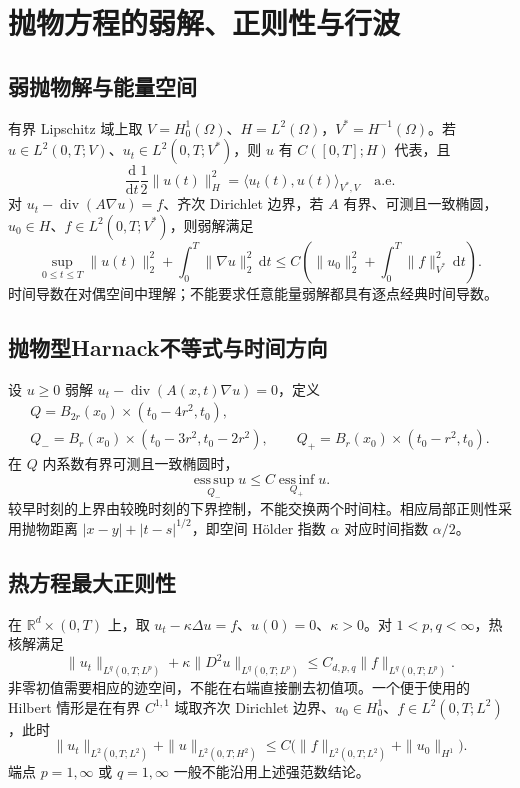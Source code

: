 \documentclass[../main.tex]{subfiles}
\begin{document}
\section{抛物方程的弱解、正则性与行波}
\subsection{弱抛物解与能量空间}
有界 Lipschitz 域上取 $V=H_0^1(\Omega)$、$H=L^2(\Omega)$，$V^*=H^{-1}(\Omega)$。若 $u\in L^2(0,T;V)$、$u_t\in L^2(0,T;V^*)$，则 $u$ 有 $C([0,T];H)$ 代表，且
\[
\frac{\mathrm d}{\mathrm dt}\frac12\|u(t)\|_H^2
=\langle u_t(t),u(t)\rangle_{V^*,V}\quad\text{a.e.}
\]
对 $u_t-\operatorname{div}(A\nabla u)=f$、齐次 Dirichlet 边界，若 $A$ 有界、可测且一致椭圆，$u_0\in H$、$f\in L^2(0,T;V^*)$，则弱解满足
\[
\sup_{0\le t\le T}\|u(t)\|_2^2+\int_0^T\|\nabla u\|_2^2\,\mathrm dt
\le C\left(\|u_0\|_2^2+\int_0^T\|f\|_{V^*}^2\,\mathrm dt\right).
\]
时间导数在对偶空间中理解；不能要求任意能量弱解都具有逐点经典时间导数。
\subsection{抛物型Harnack不等式与时间方向}
设 $u\ge0$ 弱解 $u_t-\operatorname{div}(A(x,t)\nabla u)=0$，定义
\begin{gather*}
Q=B_{2r}(x_0)\times(t_0-4r^2,t_0),\\
Q_-=B_r(x_0)\times(t_0-3r^2,t_0-2r^2),\qquad
Q_+=B_r(x_0)\times(t_0-r^2,t_0).
\end{gather*}
在 $Q$ 内系数有界可测且一致椭圆时，
\[
\operatorname*{ess\,sup}_{Q_-}u\le C\operatorname*{ess\,inf}_{Q_+}u.
\]
较早时刻的上界由较晚时刻的下界控制，不能交换两个时间柱。相应局部正则性采用抛物距离 $|x-y|+|t-s|^{1/2}$，即空间 Hölder 指数 $\alpha$ 对应时间指数 $\alpha/2$。
\subsection{热方程最大正则性}
在 $\mathbb R^d\times(0,T)$ 上，取 $u_t-\kappa\Delta u=f$、$u(0)=0$、$\kappa>0$。对 $1<p,q<\infty$，热核解满足
\[
\|u_t\|_{L^q(0,T;L^p)}
+\kappa\|D^2u\|_{L^q(0,T;L^p)}
\le C_{d,p,q}\|f\|_{L^q(0,T;L^p)}.
\]
非零初值需要相应的迹空间，不能在右端直接删去初值项。一个便于使用的 Hilbert 情形是在有界 $C^{1,1}$ 域取齐次 Dirichlet 边界、$u_0\in H_0^1$、$f\in L^2(0,T;L^2)$，此时
\[
\|u_t\|_{L^2(0,T;L^2)}+\|u\|_{L^2(0,T;H^2)}
\le C\bigl(\|f\|_{L^2(0,T;L^2)}+\|u_0\|_{H^1}\bigr).
\]
端点 $p=1,\infty$ 或 $q=1,\infty$ 一般不能沿用上述强范数结论。
\end{document}
